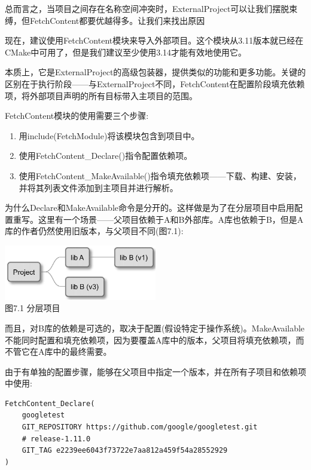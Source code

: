 总而言之，当项目之间存在名称空间冲突时，ExternalProject可以让我们摆脱束缚，但FetchContent都要优越得多。让我们来找出原因


现在，建议使用FetchContent模块来导入外部项目。这个模块从3.11版本就已经在CMake中可用了，但是我们建议至少使用3.14才能有效地使用它。

本质上，它是ExternalProject的高级包装器，提供类似的功能和更多功能。关键的区别在于执行阶段——与ExternalProject不同，FetchContent在配置阶段填充依赖项，将外部项目声明的所有目标带入主项目的范围。

FetchContent模块的使用需要三个步骤:

\begin{enumerate}
\item 
用include(FetchModule)将该模块包含到项目中。

\item 
使用FetchContent\_Declare()指令配置依赖项。

\item 
使用FetchContent\_MakeAvailable()指令填充依赖项——下载、构建、安装，并将其列表文件添加到主项目并进行解析。
\end{enumerate}

为什么Declare和MakeAvailable命令是分开的。这样做是为了在分层项目中启用配置重写。这里有一个场景——父项目依赖于A和B外部库。A库也依赖于B，但是A库的作者仍然使用旧版本，与父项目不同(图7.1):

\begin{center}
\includegraphics[width=0.5\textwidth]{content/2/chapter7/images/1.jpg}\\
图7.1 分层项目
\end{center}

而且，对B库的依赖是可选的，取决于配置(假设特定于操作系统)。MakeAvailable不能同时配置和填充依赖项，因为要覆盖A库中的版本，父项目将填充依赖项，而不管它在A库中的最终需要。

由于有单独的配置步骤，能够在父项目中指定一个版本，并在所有子项目和依赖项中使用:

\begin{lstlisting}[style=styleCMake]
FetchContent_Declare(
	googletest
	GIT_REPOSITORY https://github.com/google/googletest.git
	# release-1.11.0
	GIT_TAG e2239ee6043f73722e7aa812a459f54a28552929
)
\end{lstlisting} 

